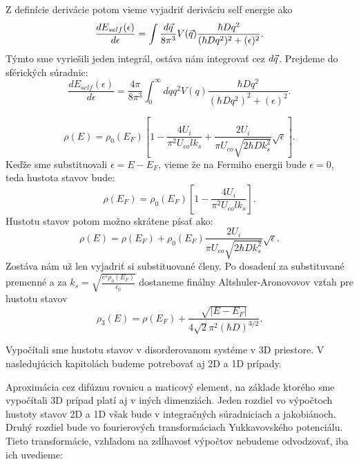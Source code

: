 Z definície derivácie potom vieme vyjadriť deriváciu self energie ako
\begin{equation}
 \label{eq:aa_selfenergy_der}
 \frac{dE_{self}(\epsilon)}{d\epsilon}=\int \frac{d\vec{q}}{8\pi^3}V(\vec{q})\frac{\hbar D q^2}{(\hbar Dq^2)^2+(\epsilon)^2}\text{.}
\end{equation}
Týmto sme vyriešili jeden integrál, ostáva nám integrovať cez $d\vec{q}$.  Prejdeme do sférických súradnic:
\begin{equation}
 \frac{dE_{self}(\epsilon)}{d\epsilon}= \frac{4\pi}{8\pi^3} \int_0^\infty dq q^2V(q)\frac{\hbar D q^2}{(\hbar Dq^2)^2+(\epsilon)^2} \text{.}
\end{equation}

\begin{equation}
 \label{eq:aa_dos3}
 \rho(E)=\rho_0(E_F)[1-\frac{4 U_i}{\pi^2 U_{co} lk_s}+\frac{2U_i }{\pi U_{co} \sqrt{2\hbar Dk_s^2}}\sqrt\epsilon ]\text{.}
\end{equation}
Keďže sme substituovali $\epsilon=E-E_F$, vieme že na Fermiho energii bude $\epsilon=0$, teda hustota stavov bude:
\begin{equation}
 \label{eq:aa_dos_fermi}
 \rho(E_F)=\rho_0(E_F)[1-\frac{4 U_i}{\pi^2 U_{co} lk_s}]\text{.}
\end{equation}
Hustotu stavov potom možno skrátene písať ako:
\begin{equation}
 \label{eq:aa_dos4}
 \rho(E)=\rho(E_F)+\rho_0(E_F)\frac{2U_i }{\pi U_{co} \sqrt{2\hbar Dk_s^2}}\sqrt\epsilon\text{.}
\end{equation}
Zostáva nám už len vyjadriť si substituované členy. Po dosadení za substituvané premenné a za
$k_s=\sqrt{\frac{e^2 \rho_0(E_F)}{\epsilon_0}}$ dostaneme finálny Altshuler-Aronovovov vzťah pre hustotu stavov
\begin{equation}
 \label{eq:aa_dos_final}
 \rho_3(E)=\rho(E_F)+\frac{\sqrt{|E-E_F|}}{4\sqrt 2 \pi^2 (\hbar D)^{3/2}}\text{.}
\end{equation}


Vypočítali sme hustotu stavov v disorderovanom systéme v 3D priestore. V nasledujúcich 
kapitolách budeme potrebovať aj 2D a 1D prípady. 

Aproximácia cez difúznu rovnicu a maticový element, na základe ktorého sme vypočítali 3D  
prípad platí aj  v iných dimenziách. Jeden rozdiel vo výpočtoch hustoty stavov 2D a 1D však bude v integračných 
súradniciach a jakobiánoch. Druhý rozdiel bude vo fourierových transformáciach 
Yukkavovského potenciálu. Tieto transformácie, vzhľadom na zdĺhavosť výpočtov nebudeme odvodzovať, iba ich uvedieme: \cite{Altshuler4}


